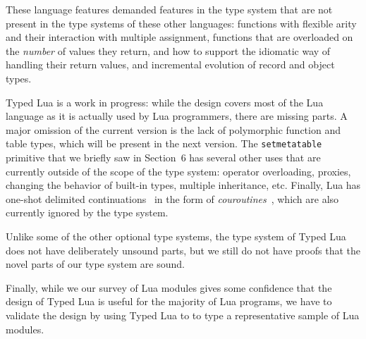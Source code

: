\documentclass{sig-alternate}
\begin{document}
These language features demanded features in the type
system that are not present in the type systems of these
other languages: functions with flexible arity and
their interaction with multiple assignment, functions
that are overloaded on the {\em number} of values
they return, and how to support the idiomatic way of
handling their return values, and incremental evolution
of record and object types.

Typed Lua is a work in progress: while the design covers
most of the Lua language as it is actually used by Lua
programmers, there are missing parts. A major omission
of the current version is the lack of polymorphic function
and table types, which will be present in the next version.
The {\tt setmetatable} primitive that we briefly saw in
Section~6 has several other uses that are currently
outside of the scope of the type system: operator
overloading, proxies, changing the behavior of built-in
types, multiple inheritance, etc. Finally, Lua has
one-shot delimited continuations~\citep{james2011yield}
in the form of {\em couroutines}~\citep{moura:coro},
which are also currently ignored by the type system.

Unlike some of the other optional type systems,
the type system of Typed Lua does not have deliberately
unsound parts, but we still do not have proofs that the
novel parts of our type system are sound.

Finally, while we our survey of Lua modules gives some
confidence that the design of Typed Lua is useful for
the majority of Lua programs, we have to validate the
design by using Typed Lua to to type a representative 
sample of Lua modules.



\end{document}

